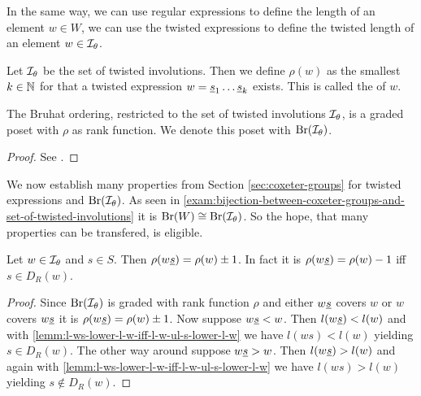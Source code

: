 In the same way, we can use regular expressions to define the length of an element $w \in W$, we can use the twisted expressions to define the twisted length of an element $w \in \mathcal{I}_{\theta}$.

\begin{defi}
	Let $\mathcal{I}_{\theta}$ be the set of twisted involutions. Then we define $\rho(w)$ as the smallest $k \in \mathbb{N}$ for that a twisted expression $w = \underline{s}_1 \ldots \underline{s}_k$ exists. This is called the  of $w$.
\end{defi}

\begin{lemm}
	The Bruhat ordering, restricted to the set of twisted involutions $\mathcal{I}_{\theta}$, is a graded poset with $\rho$ as rank function. We denote this poset with $\operatorname{Br}(\mathcal{I}_{\theta})$.

	\begin{proof}
		See \cite[Theorem 4.8]{hultman:bruhat-order}.
	\end{proof}
\end{lemm}

We now establish many properties from Section \ref{sec:coxeter-groups} for twisted expressions and $\operatorname{Br}(\mathcal{I}_{\theta})$. As seen in \ref{exam:bijection-between-coxeter-groups-and-set-of-twisted-involutions} it is $\operatorname{Br}(W) \cong \operatorname{Br}(\mathcal{I}_{\theta})$. So the hope, that many properties can be transfered, is eligible.

\begin{lemm}
	Let $w \in \mathcal{I}_{\theta}$ and $s \in S$. Then $\rho(w \underline{s}) = \rho(w) \pm 1$. In fact it is $\rho(w \underline{s}) = \rho(w) - 1$ iff $s \in D_R(w)$.

	\begin{proof}
		Since $\operatorname{Br}(\mathcal{I}_{\theta})$ is graded with rank function $\rho$ and either $w \underline{s}$ covers $w$ or $w$ covers $w \underline{s}$ it is $\rho(w \underline{s}) = \rho(w) \pm 1$. Now suppose $w \underline{s} < w$. Then $l(w \underline{s}) < l(w)$ and with \ref{lemm:l-ws-lower-l-w-iff-l-w-ul-s-lower-l-w} we have $l(w s) < l(w)$ yielding $s \in D_R(w)$. The other way around suppose $w \underline{s} > w$. Then $l(w \underline{s}) > l(w)$ and again with \ref{lemm:l-ws-lower-l-w-iff-l-w-ul-s-lower-l-w} we have $l(w s) > l(w)$ yielding $s \notin D_R(w)$.
	\end{proof}
\end{lemm}

